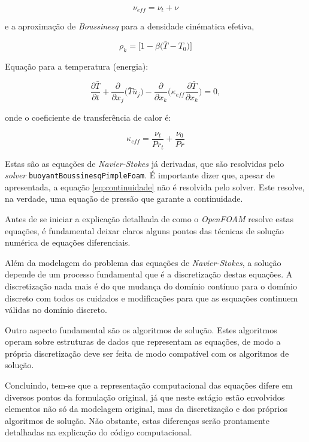 \documentclass[12pt,openright,twoside,a4paper,english,french,spanish,brazil]{abntex2}
\begin{document}
\begin{equation}
\label{eq:vefet}
\nu_{eff}=\nu_t + \nu
\end{equation}

e a aproximação de \textit{Boussinesq} para a densidade cinématica efetiva,

\begin{equation}
\label{eq:boussinesq}
\rho_k = \big[1-\beta\big(\bar{T}-T_0\big)\big]
\end{equation}

Equação para a temperatura (energia):

\begin{equation}
\label{eq:temperatura}
\frac{\partial \bar{T}}{\partial t}+\frac{\partial}{\partial x_j}\big(\bar{T}\bar{u}_j\big)-
\frac{\partial}{\partial x_k}\bigg(\kappa_{eff}\frac{\partial \bar{T}}{\partial x_k}\bigg)=0,
\end{equation}

onde o coeficiente de transferência de calor é:

\begin{equation}
\label{eq:heattransfer}
\kappa_{eff}=\frac{\nu_t}{Pr_t}+\frac{\nu_0}{Pr}
\end{equation}

Estas são as equações de \textit{Navier-Stokes} já derivadas, que são resolvidas 
pelo \textit{solver} \texttt{buoyantBoussinesqPimpleFoam}. É importante dizer que, 
apesar de apresentada, a equação \ref{eq:continuidade} não é resolvida pelo solver. 
Este resolve, na verdade, uma equação de pressão que garante a continuidade. 

Antes de se iniciar a explicação detalhada de como o \textit{OpenFOAM} resolve estas 
equações, é fundamental deixar claros alguns pontos das técnicas de solução numérica 
de equações diferenciais.

Além da modelagem do problema das equações de \textit{Navier-Stokes}, a solução depende 
de um processo fundamental que é a discretização destas equações. A discretização nada mais 
é do que mudança do domínio contínuo para o domínio discreto com todos os cuidados e 
modificações para que as esquações continuem válidas no domínio discreto. 

Outro aspecto fundamental são os algoritmos de solução. Estes algoritmos operam sobre 
estruturas de dados que representam as equações, de modo a própria discretização 
deve ser feita de modo compatível com os algoritmos de solução.

Concluindo, tem-se que a representação computacional das equações difere em diversos 
pontos da formulação original, já que neste estágio estão envolvidos elementos 
não só da modelagem original, mas da discretização e dos próprios algoritmos de solução. 
Não obstante, estas diferenças serão prontamente detalhadas na explicação do código 
computacional.
\end{document}

